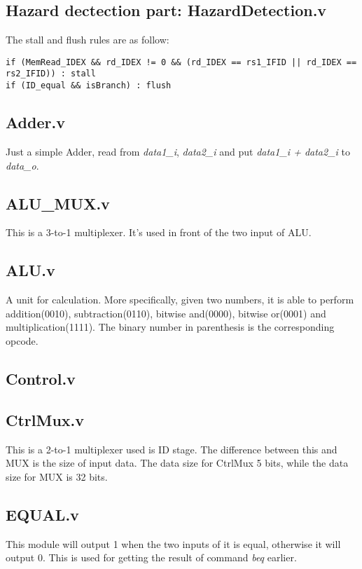 \documentclass{article}
\begin{document}
\subsection{Hazard dectection part: HazardDetection.v}
The stall and flush rules are as follow:

\begin{lstlisting}[language=text, caption=Rules, xleftmargin=10pt, xrightmargin=10pt, mathescape=true]
if (MemRead_IDEX && rd_IDEX != 0 && (rd_IDEX == rs1_IFID || rd_IDEX == rs2_IFID)) : stall
if (ID_equal && isBranch) : flush\end{lstlisting}

\subsection{Adder.v}
Just a simple Adder, read from \textit{data1\_i}, \textit{data2\_i} and put \textit{data1\_i + data2\_i} to \textit{data\_o}.

\subsection{ALU\_MUX.v}
This is a 3-to-1 multiplexer. It's used in front of the two input of ALU.

\subsection{ALU.v}
A unit for calculation. More specifically, given two numbers, it is able to perform addition(0010), subtraction(0110), bitwise and(0000), bitwise or(0001) and multiplication(1111). The binary number in parenthesis is the corresponding opcode.

\subsection{Control.v}


\subsection{CtrlMux.v}
This is a 2-to-1 multiplexer used is ID stage. The difference between this and MUX is the size of input data. The data size for CtrlMux 5 bits, while the data size for MUX is 32 bits.

\subsection{EQUAL.v}
This module will output 1 when the two inputs of it is equal, otherwise it will output 0. This is used for getting the result of command \textit{beq} earlier.
\end{document}
